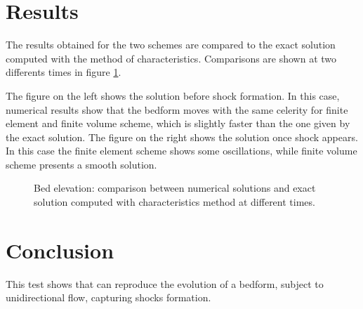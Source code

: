 \section{Results}
The results obtained for the two schemes are compared to the exact solution computed with the method of characteristics. Comparisons are shown at two differents times in figure \ref{fig:bosse-t2d:solution}.

The figure on the left shows the solution before shock formation. In this case, numerical results show that the bedform moves with the same celerity for finite element and finite volume scheme, which is slightly faster than the one given by the exact solution.
The figure on the right shows the solution once shock appears. In this case the finite element scheme shows some oscillations, while finite volume scheme presents a smooth solution.
\begin{figure}[H]
 \begin{minipage}[t]{0.5\textwidth}
  \centering
 \end{minipage}%
 \begin{minipage}[t]{0.5\textwidth}
  \centering
 \end{minipage}
 \caption{Bed elevation: comparison between numerical solutions and exact solution computed with characteristics method at different times.}
 \label{fig:bosse-t2d:solution}
\end{figure}


\section{Conclusion}
This test shows that \gaia{} can reproduce the evolution of a bedform, subject to unidirectional flow, capturing shocks formation.
%
%
%
%




